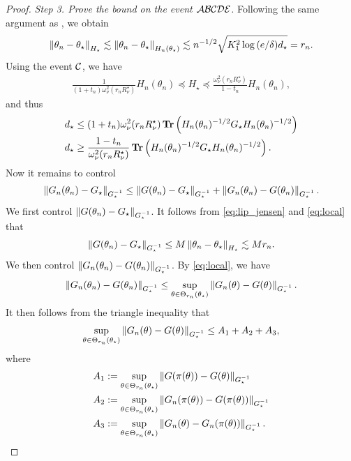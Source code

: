 \begin{proof}
    \emph{Step 3. Prove the bound on the event $\mathcal{A} \mathcal{B} \mathcal{C} \mathcal{D} \mathcal{E}$.}
    Following the same argument as , we obtain
    \begin{align}\label{eq:local}
        \left\lVert \theta_n - \theta_\star \right\rVert_{H_\star} \lesssim \left\lVert \theta_n - \theta_\star \right\rVert_{H_n(\theta_\star)} \lesssim n^{-1/2} \sqrt{K_{1}^2 \log{(e / \delta)} d_\star} = r_n.
    \end{align}
    Using the event $\mathcal{C}$, we have
    \begin{align*}
        \frac1{(1 + t_n)\omega_\nu^2(r_n R_\nu^\star)} H_n(\theta_n) \preceq H_\star \preceq \frac{\omega_\nu^2(r_n R_\nu^\star)}{1 - t_n} H_n(\theta_n),
    \end{align*}
    and thus
    \begin{equation}\label{eq:d_star_first_bound}
    \begin{split}
        d_\star &\le (1+t_n) \omega_\nu^2(r_n R_\nu^\star) \operatorname{\bf Tr}\left( H_n(\theta_n)^{-1/2} G_\star H_n(\theta_n)^{-1/2} \right) \\
        d_\star &\ge \frac{1-t_n}{\omega_\nu^2(r_n R_\nu^\star)} \operatorname{\bf Tr}\left( H_n(\theta_n)^{-1/2} G_\star H_n(\theta_n)^{-1/2} \right).
    \end{split}
    \end{equation}
    Now it remains to control
    \begin{align*}
        \left\lVert G_n(\theta_n) - G_\star \right\rVert_{G_\star^{-1}} \le \left\lVert G(\theta_n) - G_\star \right\rVert_{G_\star^{-1}} + \left\lVert G_n(\theta_n) - G(\theta_n) \right\rVert_{G_\star^{-1}}.
    \end{align*}
    We first control $\left\lVert G(\theta_n) - G_\star \right\rVert_{G_\star^{-1}}$.
    It follows from \eqref{eq:lip_jensen} and \eqref{eq:local} that
    \begin{align*}
        \left\lVert G(\theta_n) - G_\star \right\rVert_{G_\star^{-1}}
        \le M \left\lVert \theta_n - \theta_\star \right\rVert_{H_\star}
        \lesssim M r_n.
    \end{align*}
    We then control $\left\lVert G_n(\theta_n) - G(\theta_n) \right\rVert_{G_\star^{-1}}$.
    By \eqref{eq:local}, we have
    \begin{align*}
        \left\lVert G_n(\theta_n) - G(\theta_n) \right\rVert_{G_\star^{-1}}
        \le \sup_{\theta \in \Theta_{r_n}(\theta_\star)} \left\lVert G_n(\theta) - G(\theta) \right\rVert_{G_\star^{-1}}.
    \end{align*}
    It then follows from the triangle inequality that
    \begin{align*}
        \sup_{\theta \in \Theta_{r_n}(\theta_\star)} \left\lVert G_n(\theta) - G(\theta) \right\rVert_{G_\star^{-1}} \le A_1 + A_2 + A_3,
    \end{align*}
    where
    \begin{align*}
        A_1 &:= \sup_{\theta \in \Theta_{r_n}(\theta_\star)} \left\lVert G(\pi(\theta)) - G(\theta) \right\rVert_{G_\star^{-1}} \\
        A_2 &:= \sup_{\theta \in \Theta_{r_n}(\theta_\star)} \left\lVert G_n(\pi(\theta)) - G(\pi(\theta)) \right\rVert_{G_\star^{-1}} \\
        A_3 &:= \sup_{\theta \in \Theta_{r_n}(\theta_\star)} \left\lVert G_n(\theta) - G_n(\pi(\theta)) \right\rVert_{G_\star^{-1}}.
    \end{align*}
    

\end{proof}
